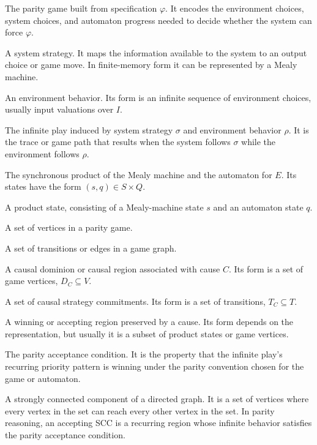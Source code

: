 \documentclass[11pt]{article}
\theoremstyle{remark}
\begin{document}
\begin{description}[leftmargin=2.8cm,style=nextline]
  \item[\(G_\varphi\)]
  The parity game built from specification \(\varphi\). It encodes the
  environment choices, system choices, and automaton progress needed to decide
  whether the system can force \(\varphi\).

  \item[\(\sigma\)]
  A system strategy. It maps the information available to the system to an
  output choice or game move. In finite-memory form it can be represented by a
  Mealy machine.

  \item[\(\rho\)]
  An environment behavior. Its form is an infinite sequence of environment
  choices, usually input valuations over \(I\).

  \item[\(\mathrm{Play}(\sigma,\rho)\)]
  The infinite play induced by system strategy \(\sigma\) and environment
  behavior \(\rho\). It is the trace or game path that results when the system
  follows \(\sigma\) while the environment follows \(\rho\).

  \item[\(P=M\times A_E\)]
  The synchronous product of the Mealy machine and the automaton for \(E\).
  Its states have the form \((s,q)\in S\times Q\).

  \item[\((s,q)\)]
  A product state, consisting of a Mealy-machine state \(s\) and an automaton
  state \(q\).

  \item[\(V\)]
  A set of vertices in a parity game.

  \item[\(T\)]
  A set of transitions or edges in a game graph.

  \item[\(D_C\)]
  A causal dominion or causal region associated with cause \(C\). Its form is a
  set of game vertices, \(D_C\subseteq V\).

  \item[\(T_C\)]
  A set of causal strategy commitments. Its form is a set of transitions,
  \(T_C\subseteq T\).

  \item[\(W\)]
  A winning or accepting region preserved by a cause. Its form depends on the
  representation, but usually it is a subset of product states or game vertices.

  \item[\(\mathrm{Acc}_{\mathrm{parity}}\)]
  The parity acceptance condition. It is the property that the infinite play's
  recurring priority pattern is winning under the parity convention chosen for
  the game or automaton.

  \item[SCC]
  A strongly connected component of a directed graph. It is a set of vertices
  where every vertex in the set can reach every other vertex in the set. In
  parity reasoning, an accepting SCC is a recurring region whose infinite
  behavior satisfies the parity acceptance condition.
\end{description}
\end{document}
